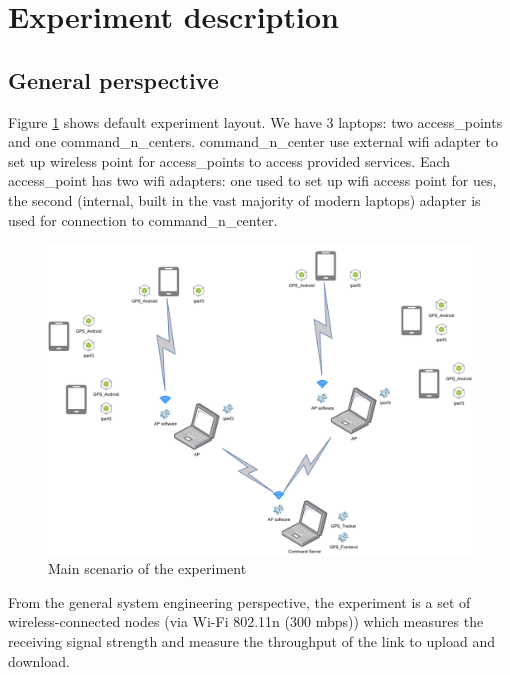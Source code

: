 
\section{Experiment description}\label{experiment-description}

\subsection{General perspective}\label{general-perspective}

Figure \ref{fig:experiment-overall-layout} shows default experiment layout. We have 3 laptops: two \glspl{access_point} and one \glspl{command_n_center}. \Gls{command_n_center} use external \gls{wifi} adapter to set up wireless point for \glspl{access_point} to access provided services. Each \gls{access_point} has two \gls{wifi} adapters: one used to set up \gls{wifi} access point for \glspl{ue}, the second (internal, built in the vast majority of modern laptops) adapter is used for connection to \gls{command_n_center}.

\begin{figure}[H]
\centering
\includegraphics[width=\linewidth,keepaspectratio]{images/Deployment Diagram-Free-structure_scheme.pdf}
\caption{Main scenario of the experiment}
\label{fig:experiment-overall-layout}
\end{figure}

From the general system engineering perspective, the experiment is a set
of wireless-connected nodes (via Wi-Fi 802.11n (300 mbps)) which measures the receiving signal strength and measure the throughput of the link to upload and download.

